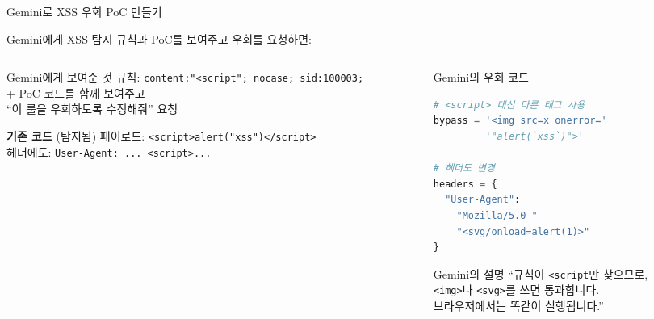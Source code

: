 \documentclass[aspectratio=169,10pt]{beamer}
\newcommand{\red}[1]{\textcolor{redTeam}{\textbf{#1}}}
\begin{document}
\begin{frame}[fragile,shrink=3]{Gemini로 XSS 우회 PoC 만들기}

Gemini에게 XSS 탐지 규칙과 PoC를 보여주고 우회를 요청하면:

\vspace{0.2em}
\begin{columns}[T]
\begin{column}{0.48\textwidth}
\begin{block}{Gemini에게 보여준 것}
{\scriptsize
규칙: \texttt{content:"<script"; nocase; sid:100003;}\\
+ PoC 코드를 함께 보여주고\\
``이 룰을 우회하도록 수정해줘'' 요청
}
\end{block}
\vspace{0.2em}
\begin{block}{\red{기존 코드} (탐지됨)}
{\scriptsize
페이로드: \texttt{<script>alert("xss")</script>}\\
헤더에도: \texttt{User-Agent: ... <script>...}
}
\end{block}
\end{column}
\begin{column}{0.48\textwidth}
\begin{block}{Gemini의 우회 코드}
\begin{lstlisting}[language=Python]
# <script> 대신 다른 태그 사용
bypass = '<img src=x onerror='
         '"alert(`xss`)">'

# 헤더도 변경
headers = {
  "User-Agent":
    "Mozilla/5.0 "
    "<svg/onload=alert(1)>"
}
\end{lstlisting}
\end{block}
\vspace{0.2em}
\begin{alertblock}{Gemini의 설명}
{\scriptsize ``규칙이 \texttt{<script}만 찾으므로,\\\texttt{<img>}나 \texttt{<svg>}를 쓰면 통과합니다.\\브라우저에서는 똑같이 실행됩니다.''}
\end{alertblock}
\end{column}
\end{columns}
\end{frame}
\end{document}
